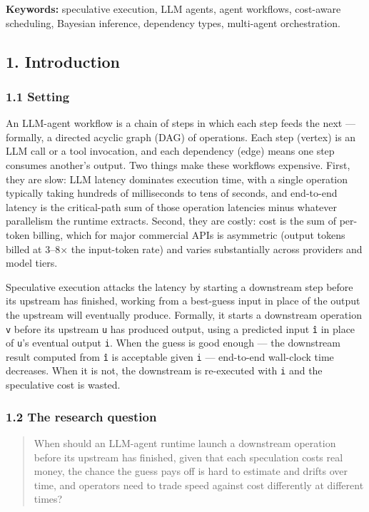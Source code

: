 \documentclass[
  11pt,
]{article}
\begin{document}
\textbf{Keywords:} speculative execution, LLM agents, agent workflows,
cost-aware scheduling, Bayesian inference, dependency types, multi-agent
orchestration.

\subsection{1. Introduction}\label{introduction}

\subsubsection{1.1 Setting}\label{setting}

An LLM-agent workflow is a chain of steps in which each step feeds the
next --- formally, a directed acyclic graph (DAG) of operations. Each
step (vertex) is an LLM call or a tool invocation, and each dependency
(edge) means one step consumes another's output. Two things make these
workflows expensive. First, they are slow: LLM latency dominates
execution time, with a single operation typically taking hundreds of
milliseconds to tens of seconds, and end-to-end latency is the
critical-path sum of those operation latencies minus whatever
parallelism the runtime extracts. Second, they are costly: cost is the
sum of per-token billing, which for major commercial APIs is asymmetric
(output tokens billed at 3--8× the input-token rate) and varies
substantially across providers and model tiers.

Speculative execution attacks the latency by starting a downstream step
before its upstream has finished, working from a best-guess input in
place of the output the upstream will eventually produce. Formally, it
starts a downstream operation \texttt{v} before its upstream \texttt{u}
has produced output, using a predicted input \texttt{î} in place of
\texttt{u}'s eventual output \texttt{i}. When the guess is good enough
--- the downstream result computed from \texttt{î} is acceptable given
\texttt{i} --- end-to-end wall-clock time decreases. When it is not, the
downstream is re-executed with \texttt{i} and the speculative cost is
wasted.

\subsubsection{1.2 The research question}\label{the-research-question}

\begin{quote}
When should an LLM-agent runtime launch a downstream operation before
its upstream has finished, given that each speculation costs real money,
the chance the guess pays off is hard to estimate and drifts over time,
and operators need to trade speed against cost differently at different
times?
\end{quote}
\end{document}

